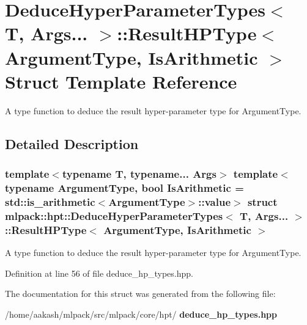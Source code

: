 \section{Deduce\+Hyper\+Parameter\+Types$<$ T, Args... $>$\+:\+:Result\+H\+P\+Type$<$ Argument\+Type, Is\+Arithmetic $>$ Struct Template Reference}
\label{structmlpack_1_1hpt_1_1DeduceHyperParameterTypes_3_01T_00_01Args_8_8_8_01_4_1_1ResultHPType}


A type function to deduce the result hyper-\/parameter type for Argument\+Type.  




\subsection{Detailed Description}
\subsubsection*{template$<$typename T, typename... Args$>$\newline
template$<$typename Argument\+Type, bool Is\+Arithmetic = std\+::is\+\_\+arithmetic$<$\+Argument\+Type$>$\+::value$>$\newline
struct mlpack\+::hpt\+::\+Deduce\+Hyper\+Parameter\+Types$<$ T, Args... $>$\+::\+Result\+H\+P\+Type$<$ Argument\+Type, Is\+Arithmetic $>$}

A type function to deduce the result hyper-\/parameter type for Argument\+Type. 

Definition at line 56 of file deduce\+\_\+hp\+\_\+types.\+hpp.



The documentation for this struct was generated from the following file\+:\begin{DoxyCompactItemize}
\item 
/home/aakash/mlpack/src/mlpack/core/hpt/\textbf{ deduce\+\_\+hp\+\_\+types.\+hpp}\end{DoxyCompactItemize}
